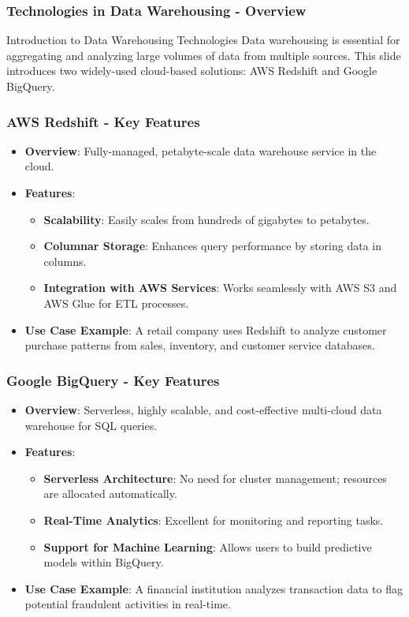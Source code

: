 \documentclass{beamer}
\begin{document}
\begin{frame}[fragile]
    \frametitle{Technologies in Data Warehousing - Overview}
    \begin{block}{Introduction to Data Warehousing Technologies}
        Data warehousing is essential for aggregating and analyzing large volumes of data from multiple sources. 
        This slide introduces two widely-used cloud-based solutions: AWS Redshift and Google BigQuery.
    \end{block}
\end{frame}

\begin{frame}[fragile]
    \frametitle{AWS Redshift - Key Features}
    \begin{itemize}
        \item \textbf{Overview}: Fully-managed, petabyte-scale data warehouse service in the cloud.
        \item \textbf{Features}:
            \begin{itemize}
                \item \textbf{Scalability}: Easily scales from hundreds of gigabytes to petabytes.
                \item \textbf{Columnar Storage}: Enhances query performance by storing data in columns.
                \item \textbf{Integration with AWS Services}: Works seamlessly with AWS S3 and AWS Glue for ETL processes.
            \end{itemize}
        \item \textbf{Use Case Example}: A retail company uses Redshift to analyze customer purchase patterns from sales, inventory, and customer service databases.
    \end{itemize}
\end{frame}

\begin{frame}[fragile]
    \frametitle{Google BigQuery - Key Features}
    \begin{itemize}
        \item \textbf{Overview}: Serverless, highly scalable, and cost-effective multi-cloud data warehouse for SQL queries.
        \item \textbf{Features}:
            \begin{itemize}
                \item \textbf{Serverless Architecture}: No need for cluster management; resources are allocated automatically.
                \item \textbf{Real-Time Analytics}: Excellent for monitoring and reporting tasks.
                \item \textbf{Support for Machine Learning}: Allows users to build predictive models within BigQuery.
            \end{itemize}
        \item \textbf{Use Case Example}: A financial institution analyzes transaction data to flag potential fraudulent activities in real-time.
    \end{itemize}
\end{frame}
\end{document}
